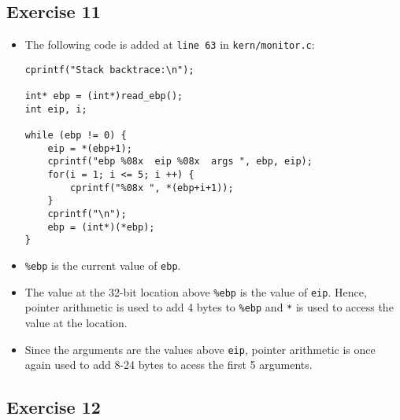 \documentclass[]{article}
\begin{document}
\subsection{Exercise 11}

\begin{itemize}
\item
  The following code is added at \texttt{line 63} in
  \texttt{kern/monitor.c}:

\begin{verbatim}
cprintf("Stack backtrace:\n");

int* ebp = (int*)read_ebp();
int eip, i;

while (ebp != 0) {
    eip = *(ebp+1);
    cprintf("ebp %08x  eip %08x  args ", ebp, eip);
    for(i = 1; i <= 5; i ++) {
        cprintf("%08x ", *(ebp+i+1));
    }
    cprintf("\n");
    ebp = (int*)(*ebp);
}
\end{verbatim}
\item
  \texttt{\%ebp} is the current value of \texttt{ebp}.
\item
  The value at the 32-bit location above \texttt{\%ebp} is the value of
  \texttt{eip}. Hence, pointer arithmetic is used to add 4 bytes to
  \texttt{\%ebp} and \texttt{*} is used to access the
  value at the location.
\item
  Since the arguments are the values above \texttt{eip}, pointer
  arithmetic is once again used to add 8-24 bytes to acess the first 5
  arguments.
\end{itemize}

\subsection{Exercise 12}
\end{document}
